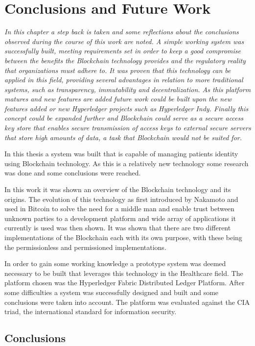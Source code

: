 \chapter{Conclusions and Future Work}
\label{Conclusion}

\emph{In this chapter a step back is taken and some reflections about the
conclusions observed during the course of this work are noted. A simple working
system was successfully built, meeting requirements set in order to keep a good
compromise between the benefits the Blockchain technology provides and the
regulatory reality that organizations must adhere to. It was proven that this
technology can be applied in this field, providing several advantages in
relation to more traditional systems, such as transparency, immutability and
decentralization. As this platform matures and new features are added future
work could be built upon the new features added or new Hyperledger projects
such as Hyperledger Indy. Finally this concept could be expanded further and
Blockchain could serve as a secure access key store that enables secure
transmission of access keys to external secure servers that store high amounts
of data, a task that Blockchain would not be suited for.}

In this thesis a system was built that is capable of managing patients identity
using Blockchain technology. As this is a relatively new technology some
research was done and some conclusions were reached.

In this work it was shown an overview of the Blockchain technology and its
origins. The evolution of this technology as first introduced by Nakamoto and
used in Bitcoin to solve the need for a middle man and enable trust between
unknown parties to a development platform and wide array of applications it
currently is used was then shown. It was shown that there are two different
implementations of the Blockchain each with its own purpose, with these being
the permissionless and permissioned implementations.

In order to gain some working knowledge a prototype system was deemed necessary
to be built that leverages this technology in the Healthcare field. The
platform chosen was the Hyperledger Fabric Distributed Ledger Platform. After
some difficulties a system was successfully designed and built and some
conclusions were taken into account. The platform was evaluated against the CIA
triad, the international standard for information security.

\section{Conclusions}

